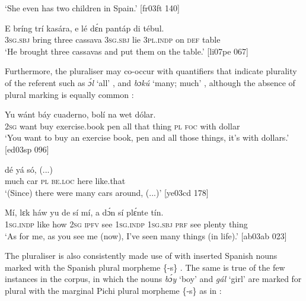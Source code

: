 \glt ‘She even has two children in Spain.’ [fr03ft 140]
\z


\ea%
    \label{ex:key:212}
    \gll E    bríng  trí    kasára,  e    lé  dɛ́n    pantáp  di  tébul.\\
\textsc{3sg.sbj}  bring  three  cassava  \textsc{3sg.sbj}  lie  \textsc{3pl.indp}  on    \textsc{def}  table\\

\glt ‘He brought three cassavas and put them on the table.’ [li07pe 067]
\z

Furthermore, the pluraliser may co-occur with quantifiers that indicate plurality of the referent such as \textit{ɔ́l} ‘all’ , and \textit{bɔkú} ‘many; much’ , although the absence of plural marking is equally common : 


\ea%
    \label{ex:key:213}
    \gll Yu  wánt  báy  cuaderno,    bolí          
na  wet    dólar.\\
\textsc{2sg}  want  buy  exercise.book    pen  all  that  thing  \textsc{pl}
\textsc{foc}  with    dollar\\

\glt ‘You want to buy an exercise book, pen and all those things, it’s with dollars.’ [ed03sp 096] 
\z


\ea%
    \label{ex:key:214}
    \gll {}    dé    yá    só,    (...)\\
much  car    \textsc{pl}  \textsc{be.loc}  here    like.that\\

\glt ‘(Since) there were many cars around, (...)’ [ye03cd 178]
\z


\ea%
    \label{ex:key:215}
    \gll Mí,    lɛk  háw  yu  de  sí  mí,    a    dɔ́n  
sí  plɛ́nte  tín.\\
\textsc{1sg.indp}  like  how  \textsc{2sg}  \textsc{ipfv}  see  \textsc{1sg.indp}  \textsc{1sg.sbj}  \textsc{prf}  
see  plenty  thing \\

\glt ‘As for me, as you see me (now), I’ve seen many things (in life).’ [ab03ab 023]
\z

The pluraliser is also consistently made use of with inserted Spanish nouns marked with the Spanish plural morpheme \{-s\} . The same is true of the few instances in the corpus, in which the nouns \textit{bɔ́y} ‘boy’ and \textit{gál} ‘girl’ are marked for plural with the marginal Pichi plural morpheme \{-s\} as in :


